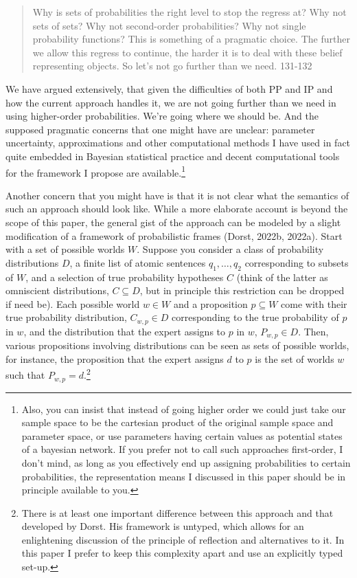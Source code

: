 \documentclass[
  letterpaper,
  DIV=11,
  numbers=noendperiod]{scrartcl}
\begin{document}
\begin{quote}
Why is sets of probabilities the right level to stop the regress at? Why not sets of sets? Why not second-order 
probabilities? Why not single probability functions? This is something of a pragmatic choice. The further we 
allow this regress to continue, the harder it is to deal with these belief representing objects. So let's not
 go further than we need. 131-132\end{quote}

We have argued extensively, that given the difficulties of both PP and
IP and how the current approach handles it, we are not going further
than we need in using higher-order probabilities. We're going where we
should be. And the supposed pragmatic concerns that one might have are
unclear: parameter uncertainty, approximations and other computational
methods I have used in fact quite embedded in Bayesian statistical
practice and decent computational tools for the framework I propose are
available.\footnote{Also, you can insist that instead of
  going higher order we could just take our sample space to be the cartesian product of the original sample
   space and parameter space, or use parameters having certain values as potential states of a bayesian network. 
   If you prefer not to call such approaches first-order, I don't mind, as long as you effectively end up
    assigning probabilities to certain probabilities, the representation means I discussed in this paper
     should be in principle available to you.}

Another concern that you might have is that it is not clear what the
semantics of such an approach should look like. While a more elaborate
account is beyond the scope of this paper, the general gist of the
approach can be modeled by a slight modification of a framework of
probabilistic frames (Dorst, 2022b, 2022a). Start with a set of possible
worlds \(W\). Suppose you consider a class of probability distributions
\(D\), a finite list of atomic sentences \(q_1, \dots, q_2\)
corresponding to subsets of \(W\), and a selection of true probability
hypotheses \(C\) (think of the latter as omniscient distributions,
\(C\subseteq D\), but in principle this restriction can be dropped if
need be). Each possible world \(w\in W\) and a proposition
\(p\subseteq W\) come with their true probability distribution,
\(C_{w,p}\in D\) corresponding to the true probability of \(p\) in
\(w\), and the distribution that the expert assigns to \(p\) in \(w\),
\(P_{w,p}\in D\). Then, various propositions involving distributions can
be seen as sets of possible worlds, for instance, the proposition that
the expert assigns \(d\) to \(p\) is the set of worlds \(w\) such that
\(P_{w,p}=d\).\footnote{There is at least one important 
difference between this approach and that developed by Dorst. His  framework is untyped, which allows for 
an enlightening discussion of the principle of reflection and alternatives to it. In this paper I prefer 
to keep this complexity apart and use an explicitly typed set-up.}
\end{document}
